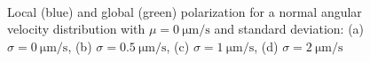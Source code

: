\documentclass[../../master_thesis_np.tex]{subfiles}
\begin{document}
		\begin{figure}
		\centering
		\ContinuedFloat
			\\
			
			\caption{Local (blue) and global (green) polarization for a normal angular velocity distribution with $\mu = \SI{0}{\um\per\second}$ and standard deviation: (a) $\sigma = \SI{0}{\um\per\second}$, (b) $\sigma = \SI{0.5}{\um\per\second}$, (c) $\sigma = \SI{1}{\um\per\second}$, (d) $\sigma = \SI{2}{\um\per\second}$}
			\label{fig:lj_av_pol}
		\end{figure}
		
\end{document}
